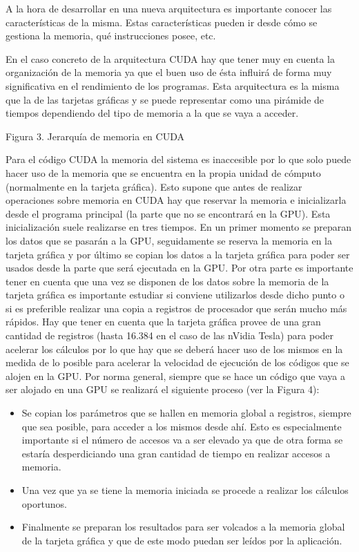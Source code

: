 A la hora de desarrollar en una nueva arquitectura es importante conocer las características de la misma. Estas características pueden ir desde cómo se gestiona la memoria, qué instrucciones posee, etc.

En el caso concreto de la arquitectura CUDA hay que tener muy en cuenta la organización de la memoria ya que el buen uso de ésta influirá de forma muy significativa en el rendimiento de los programas. Esta arquitectura es la misma que la de las tarjetas gráficas y se puede representar como una pirámide de tiempos dependiendo del tipo de memoria a la que se vaya a acceder.


Figura 3. Jerarquía de memoria en CUDA

Para el código CUDA la memoria del sistema es inaccesible por lo que solo puede hacer uso de la memoria que se encuentra en la propia unidad de cómputo (normalmente en la tarjeta gráfica). Esto supone que antes de realizar operaciones sobre memoria en CUDA hay que reservar la memoria e inicializarla desde el programa principal (la parte que no se encontrará en la GPU). Esta inicialización suele realizarse en tres tiempos. En un primer momento se preparan los datos que se pasarán a la GPU, seguidamente se reserva la memoria en la tarjeta gráfica y por último se copian los datos a la tarjeta gráfica para poder ser usados desde la parte que será ejecutada en la GPU.
Por otra parte es importante tener en cuenta que una vez se disponen de los datos sobre la memoria de la tarjeta gráfica es importante estudiar si conviene utilizarlos desde dicho punto o si es preferible realizar una copia a registros de procesador que serán mucho más rápidos. Hay que tener en cuenta que la tarjeta gráfica provee de una gran cantidad de registros (hasta 16.384 en el caso de las nVidia Tesla) para poder acelerar los cálculos por lo que hay que se deberá hacer uso de los mismos en la medida de lo posible para acelerar la velocidad de ejecución de los códigos que se alojen en la GPU.
Por norma general, siempre que se hace un código que vaya a ser alojado en una GPU se realizará el siguiente proceso (ver la Figura 4):

\begin{itemize}
	\item Se copian los parámetros que se hallen en memoria global a registros, siempre que sea posible, para acceder a los mismos desde ahí. Esto es especialmente importante si el número de accesos va a ser elevado ya que de otra forma se estaría desperdiciando una gran cantidad de tiempo en realizar accesos a memoria.
	\item Una vez que ya se tiene la memoria iniciada se procede a realizar los cálculos oportunos.
	\item Finalmente se preparan los resultados para ser volcados a la memoria global de la tarjeta gráfica y que de este modo puedan ser leídos por la aplicación.
\end{itemize}
 
